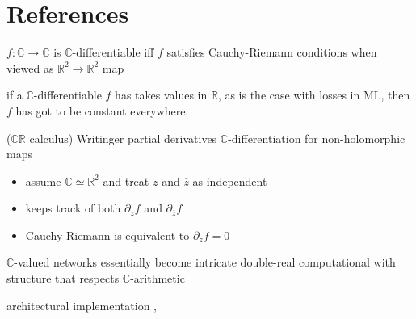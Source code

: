 \documentclass{beamer}
\newcommand{\real}{\mathbb{R}}
\newcommand{\cplx}{\mathbb{C}}
\newcommand{\conj}[1]{\overline{#1}}
\begin{document}

\section{References} %
\label{sec:references}

\begin{frame}{\insertsection}
  \tiny
  
  
\end{frame}


\begin{frame}[t]{\insertsection}

  $f\colon \cplx\to \cplx$ is $\cplx$-differentiable iff $f$ satisfies
  Cauchy-Riemann conditions when viewed as $\real^2 \to \real^2$ map

  if a $\cplx$-differentiable $f$ has takes values in $\real$, as is the
  case with losses in ML, then $f$ has got to be constant everywhere.

  ($\cplx\real$ calculus) Writinger partial derivatives $\cplx$-differentiation for non-holomorphic maps
  \begin{itemize}
    \item assume $\cplx\simeq \real^2$ and treat $z$ and $\conj{z}$ as independent
    \item keeps track of both $
      \partial_z f
    $ and $
      \partial_{\conj{z}} f
    $
    \item Cauchy-Riemann is equivalent to $\partial_{\conj{z}} f = 0$
  \end{itemize}


  $\cplx$-valued networks essentially become intricate double-real computational
  with structure that respects $\cplx$-arithmetic

  architectural implementation \cite{trabelsi_deep_2018}, \cite{arjovsky_unitary_2016}
\end{frame}
\end{document}
